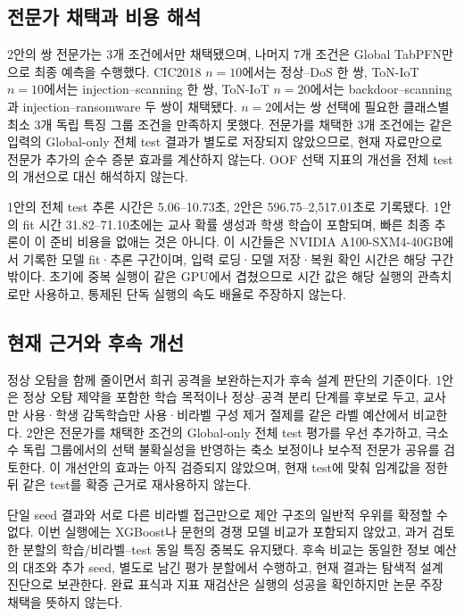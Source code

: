 

\subsection{전문가 채택과 비용 해석}
2안의 쌍 전문가는 3개 조건에서만 채택됐으며, 나머지 7개 조건은 Global TabPFN만으로 최종 예측을 수행했다.
CIC2018 $n=10$에서는 정상--DoS 한 쌍, ToN-IoT $n=10$에서는 injection--scanning 한 쌍, ToN-IoT $n=20$에서는 backdoor--scanning과 injection--ransomware 두 쌍이 채택됐다.
$n=2$에서는 쌍 선택에 필요한 클래스별 최소 3개 독립 특징 그룹 조건을 만족하지 못했다.
전문가를 채택한 3개 조건에는 같은 입력의 Global-only 전체 test 결과가 별도로 저장되지 않았으므로, 현재 자료만으로 전문가 추가의 순수 증분 효과를 계산하지 않는다.
OOF 선택 지표의 개선을 전체 test의 개선으로 대신 해석하지 않는다.

1안의 전체 test 추론 시간은 5.06--10.73초, 2안은 596.75--2,517.01초로 기록됐다.
1안의 fit 시간 31.82--71.10초에는 교사 확률 생성과 학생 학습이 포함되며, 빠른 최종 추론이 이 준비 비용을 없애는 것은 아니다.
이 시간들은 NVIDIA A100-SXM4-40GB에서 기록한 모델 fit·추론 구간이며, 입력 로딩·모델 저장·복원 확인 시간은 해당 구간 밖이다.
초기에 중복 실행이 같은 GPU에서 겹쳤으므로 시간 값은 해당 실행의 관측치로만 사용하고, 통제된 단독 실행의 속도 배율로 주장하지 않는다.

\subsection{현재 근거와 후속 개선}
정상 오탐을 함께 줄이면서 희귀 공격을 보완하는지가 후속 설계 판단의 기준이다.
1안은 정상 오탐 제약을 포함한 학습 목적이나 정상--공격 분리 단계를 후보로 두고, 교사만 사용·학생 감독학습만 사용·비라벨 구성 제거 절제를 같은 라벨 예산에서 비교한다.
2안은 전문가를 채택한 조건의 Global-only 전체 test 평가를 우선 추가하고, 극소수 독립 그룹에서의 선택 불확실성을 반영하는 축소 보정이나 보수적 전문가 공유를 검토한다.
이 개선안의 효과는 아직 검증되지 않았으며, 현재 test에 맞춰 임계값을 정한 뒤 같은 test를 확증 근거로 재사용하지 않는다.

단일 seed 결과와 서로 다른 비라벨 접근만으로 제안 구조의 일반적 우위를 확정할 수 없다.
이번 실행에는 XGBoost나 문헌의 경쟁 모델 비교가 포함되지 않았고, 과거 검토한 분할의 학습/비라벨--test 동일 특징 중복도 유지됐다.
후속 비교는 동일한 정보 예산의 대조와 추가 seed, 별도로 남긴 평가 분할에서 수행하고, 현재 결과는 탐색적 설계 진단으로 보관한다.
완료 표식과 지표 재검산은 실행의 성공을 확인하지만 논문 주장 채택을 뜻하지 않는다.

